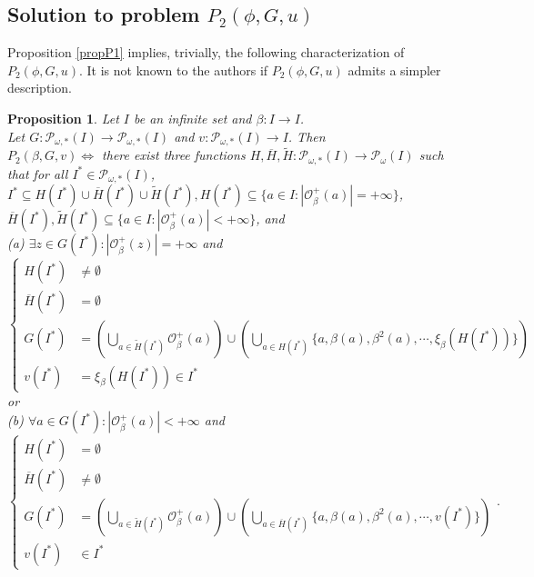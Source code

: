 \documentclass[a4paper,11pt]{article}
\theoremstyle{plain}
\newtheorem{proposition}{Proposition}[section]
\theoremstyle{definition}
\theoremstyle{remark}
\begin{document}
\subsection{Solution to problem $P_2(\phi,G,u)$}

Proposition \ref{propP1} implies, trivially, the following characterization of $P_2(\phi,G,u)$. It is not known to the authors if $P_2(\phi,G,u)$ admits a simpler description.

\begin{proposition}
\label{propP2}
Let $I$ be an infinite set and $\beta : I \to I$. \\
Let $G : \mathcal{P}_{\omega,*}(I) \to \mathcal{P}_{\omega,*}(I)$ and $v : \mathcal{P}_{\omega,*}(I) \to I$. Then \\
$P_2(\beta,G,v) \Leftrightarrow$ there exist three functions $H,\overline{H}, \widetilde{H} : \mathcal{P}_{\omega,*}(I) \to \mathcal{P}_{\omega}(I)$ such that for all $I^* \in \mathcal{P}_{\omega,*}(I)$,  $I^* \subseteq H(I^*) \cup \overline{H}(I^*) \cup \widetilde{H}(I^*), H(I^*) \subseteq \{a \in I : |\mathcal{O}^{+}_\beta(a)| = +\infty\}$, $\overline{H}(I^*), \widetilde{H}(I^*) \subseteq \{a \in I : |\mathcal{O}^{+}_\beta(a)| < +\infty\}$, and \\
(a) $\exists z \in G(I^*) : |\mathcal{O}^{+}_\beta(z)| = +\infty$ and \\
\[ \begin{cases} H(I^*) &\neq \emptyset \\ \overline{H}(I^*) &= \emptyset \\ G(I^*) &= \left( \bigcup_{a \in \widetilde{H}(I^*)} \mathcal{O}^{+}_\beta(a) \right) \cup \left( \bigcup_{a \in H(I^*)} \{a, \beta(a), \beta^2(a), \cdots, \xi_\beta(H(I^*))\} \right) \\ v(I^*) &= \xi_\beta(H(I^*)) \in I^* \end{cases} \] 
or \\
(b) $\forall a \in G(I^*) : |\mathcal{O}^{+}_\beta(a)|<+\infty$ and
\[ \begin{cases} H(I^*) &= \emptyset \\ \overline{H}(I^*) &\neq \emptyset \\ G(I^*) &= \left( \bigcup_{a \in \widetilde{H}(I^*)} \mathcal{O}^{+}_\beta(a) \right) \cup \left( \bigcup_{a \in \overline{H}(I^*)} \{a, \beta(a), \beta^2(a), \cdots, v(I^*)\} \right) \\ v(I^*) &\in I^* \end{cases}. \] 
\end{proposition}
\end{document}
